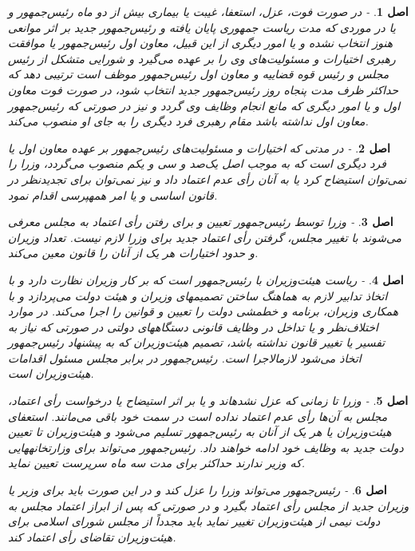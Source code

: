 \documentclass[12pt]{article}
\newtheorem{asl}{اصل}
\begin{document}
\begin{asl}- 
در صورت فوت، عزل، استعفا، غیبت یا بیماری بیش از دو ماه رئیس‌جمهور و یا در موردی که مدت ریاست جمهوری پایان یافته و رئیس‌جمهور جدید بر اثر موانعی هنوز انتخاب نشده و یا امور دیگری از این قبیل، معاون اول رئیس‌جمهور یا موافقت رهبری اختیارات و مسئولیت‌های وی را بر عهده می‌گیرد و شورایی متشکل از رئیس مجلس و رئیس قوه قضاییه و معاون اول رئیس‌جمهور موظف است ترتیبی دهد که حداکثر ظرف مدت پنجاه روز رئیس‌جمهور جدید انتخاب شود، در صورت فوت معاون اول و یا امور دیگری که مانع انجام وظایف وی گردد و نیز در صورتی که رئیس‌جمهور معاون اول نداشته باشد مقام رهبری فرد دیگری را به جای او منصوب می‌کند. 
\end{asl}

\begin{asl}- 
در مدتی که اختیارات و مسئولیت‌های رئیس‌جمهور بر عهده معاون اول یا فرد دیگری است که به موجب اصل یک‌صد و سی و یکم منصوب می‌گردد، وزرا را نمی‌توان استیضاح کرد یا به آنان رأی عدم اعتماد داد و نیز نمی‌توان برای تجدیدنظر در قانون اساسی و یا امر همه‏پرسی اقدام نمود. 
\end{asl}

\begin{asl}- 
وزرا توسط رئیس‌جمهور تعیین و برای رفتن رأی اعتماد به مجلس معرفی می‌شوند با تغییر مجلس، گرفتن رأی اعتماد جدید برای وزرا لازم نیست. تعداد وزیران و حدود اختیارات هر یک از آنان را قانون معین می‌کند. 
\end{asl}

\begin{asl}- 
ریاست هیئت‌وزیران با رئیس‌جمهور است که بر کار وزیران نظارت دارد و با اتخاذ تدابیر لازم به هماهنگ ساختن تصمیم‏های وزیران و هیئت دولت می‌پردازد و با همکاری وزیران، برنامه و خط‏مشی دولت را تعیین و قوانین را اجرا می‌کند. در موارد اختلاف‌نظر و یا تداخل در وظایف قانونی دستگا‏ه‏های دولتی در صورتی که نیاز به تفسیر یا تغییر قانون نداشته باشد، تصمیم هیئت‌وزیران که به پیشنهاد رئیس‌جمهور اتخاذ می‌شود لازم‏الاجرا است. رئیس‌جمهور در برابر مجلس مسئول اقدامات هیئت‌وزیران است.  
\end{asl}

\begin{asl}- 
وزرا تا زمانی که عزل نشده‏اند و یا بر اثر استیضاح یا درخواست رأی اعتماد، مجلس به آن‌ها رأی عدم اعتماد نداده است در سمت خود باقی می‌مانند. استعفای هیئت‌وزیران یا هر یک از آنان به رئیس‌جمهور تسلیم می‌شود و هیئت‌وزیران تا تعیین دولت جدید به وظایف خود ادامه خواهند داد. رئیس‌جمهور می‌تواند برای وزارتخانه‏هایی که وزیر ندارند حداکثر برای مدت سه ماه سرپرست تعیین نماید. 
\end{asl}

\begin{asl}- 
رئیس‌جمهور می‌تواند وزرا را عزل کند و در این صورت باید برای وزیر یا وزیران جدید از مجلس رأی اعتماد بگیرد و در صورتی که پس از ابراز اعتماد مجلس به دولت نیمی از هیئت‌وزیران تغییر نماید باید مجدداً از مجلس شورای اسلامی برای هیئت‌وزیران تقاضای رأی اعتماد کند. 
\end{asl}
\end{document}
